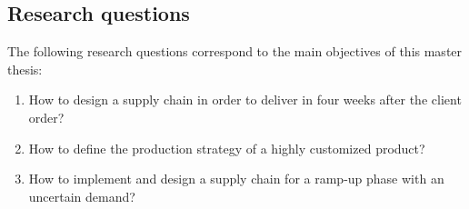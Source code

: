 \subsection{Research questions}
\label{section:research_questions}

The following research questions correspond to the main objectives of this master thesis:

\begin{enumerate}
    \item How to design a supply chain in order to deliver in four weeks after the client order?
    \item How to define the production strategy of a highly customized product?
    \item How to implement and design a supply chain for a ramp-up phase with an uncertain demand?
\end{enumerate}
